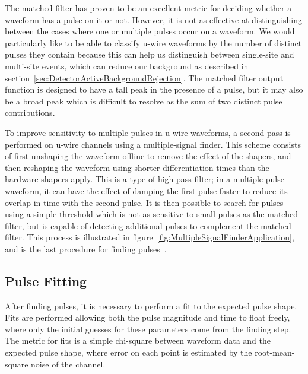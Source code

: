 The matched filter has proven to be an excellent metric for deciding whether a waveform has a pulse on it or not.  However, it is not as effective at distinguishing between the cases where one or multiple pulses occur on a waveform.  We would particularly like to be able to classify u-wire waveforms by the number of distinct pulses they contain because this can help us distinguish between single-site and multi-site events, which can reduce our background as described in section~\ref{sec:DetectorActiveBackgroundRejection}.  The matched filter output function is designed to have a tall peak in the presence of a pulse, but it may also be a broad peak which is difficult to resolve as the sum of two distinct pulse contributions.

To improve sensitivity to multiple pulses in u-wire waveforms, a second pass is performed on u-wire channels using a multiple-signal finder.  This scheme consists of first unshaping the waveform offline to remove the effect of the shapers, and then reshaping the waveform using shorter differentiation times than the hardware shapers apply.  This is a type of high-pass filter; in a multiple-pulse waveform, it can have the effect of damping the first pulse faster to reduce its overlap in time with the second pulse.  It is then possible to search for pulses using a simple threshold which is not as sensitive to small pulses as the matched filter, but is capable of detecting additional pulses to complement the matched filter.  This process is illustrated in figure~\ref{fig:MultipleSignalFinderApplication}, and is the last procedure for finding pulses~\cite{ReconstructionDocument}.

\subsection{Pulse Fitting}\label{sec:ReconPulseFitting}

After finding pulses, it is necessary to perform a fit to the expected pulse shape.  Fits are performed allowing both the pulse magnitude and time to float freely, where only the initial guesses for these parameters come from the finding step.  The metric for fits is a simple chi-square between waveform data and the expected pulse shape, where error on each point is estimated by the root-mean-square noise of the channel.

